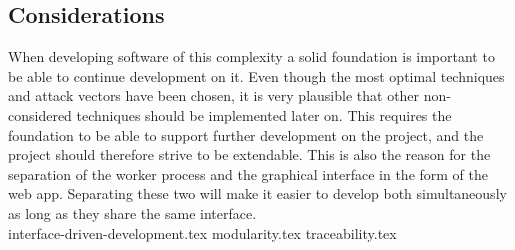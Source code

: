 \documentclass{article}
\begin{document}
\subsection{Considerations}
\label{sec:considerations}
When developing software of this complexity a solid foundation is important to be able to continue development on it. Even though the most optimal techniques and attack vectors have been chosen, it is very plausible that other non-considered techniques should be implemented later on. This requires the foundation to be able to support further development on the project, and the project should therefore strive to be extendable. This is also the reason for the separation of the worker process and the graphical interface in the form of the web app. Separating these two will make it easier to develop both simultaneously as long as they share the same interface.
\\
{interface-driven-development.tex}
{modularity.tex}
{traceability.tex}
\end{document}
